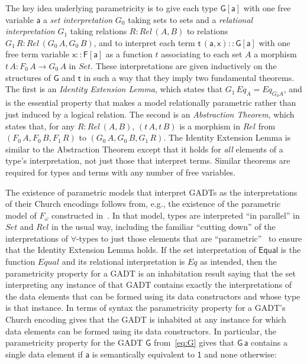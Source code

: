 \documentclass[acmsmall,screen,review,anonymous]{acmart}
\theoremstyle{definition}
\begin{document}
The key idea underlying parametricity is to give each type
$\mathsf{G[a]}$ with one free variable $\mathsf{a}$ a {\em set
  interpretation} $G_0$ taking sets to sets and a \emph{relational
  interpretation} $G_1$ taking relations $R : \mathit{Rel}\,(A,B)$ to
relations $G_1 \,R : \mathit{Rel}\,(G_0 \,A, G_0 \,B)$, and to
interpret each term $\mathsf{t\,(a,x) :: G[a]}$ with one free term
variable $\mathsf{x :: F[a]}$ as a function $t$ associating to each
set $A$ a morphism $t \,A : F_0\,A \to G_0\,A$ in $\mathit{Set}$.
These interpretations are given inductively on the structures of
$\mathsf{G}$ and $\mathsf{t}$ in such a way that they imply two
fundamental theorems. The first is an \emph{Identity Extension Lemma},
which states that $G_1\,\mathit{Eq}_A = \mathit{Eq}_{G_0 A}$, and is
the essential property that makes a model relationally parametric
rather than just induced by a logical relation.  The second is an
\emph{Abstraction Theorem}, which states that, for any $R
:\mathit{Rel}\,(A, B)$, $(t\, A, t\,B)$ is a morphism in
$\mathit{Rel}$ from $(F_0\,A,F_0\,B,F_1\,R)$ to
$(G_0\,A,G_0\,B,G_1\,R)$. The Identity Extension Lemma is similar to
the Abstraction Theorem except that it holds for {\em all} elements of
a type's interpretation, not just those that interpret terms.  Similar
theorems are required for types and terms with any number of free
variables.

The existence of parametric models that interpret GADTs as the
interpretations of their Church encodings follows from, e.g., the
existence of the parametric model of $F_\omega$ constructed
in~\cite{atk12}.  In that model, types are interpreted ``in parallel''
in $\mathit{Set}$ and $\mathit{Rel}$ in the usual way, including the
familiar ``cutting down'' of the interpretations of $\forall$-types to
just those elements that are ``parametric''~\cite{rey83,wad89} to
ensure that the Identity Extension Lemma holds. If the set
interpretation of $\mathsf{Equal}$ is the function $\mathit{Equal}$
and its relational interpretation is $\mathit{Eq}$ as intended, then
the parametricity property for a GADT is an inhabitation result saying
that the set interpreting any instance of that GADT contains exactly
the interpretations of the data elements that can be formed using its
data constructors and whose type is that instance. In terms of syntax
the parametricity property for a GADT's Church encoding gives that the
GADT is inhabited at any instance for which data elements can be
formed using its data constructors. In particular, the parametricity
property for the GADT $\mathsf{G}$ from~\eqref{eq:G} gives that
$\mathsf{G\,a}$ contains a single data element if $\mathsf{a}$ is
semantically equivalent to $\mathsf{1}$ and none otherwise:
\end{document}
